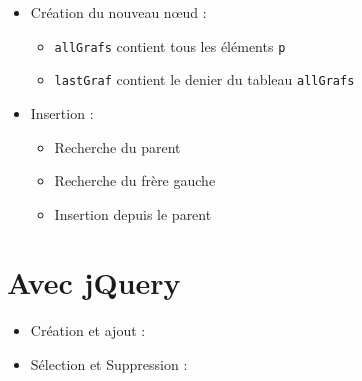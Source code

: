 \begin{itemize}
\tightlist
\item
  Création du nouveau nœud :

  \begin{itemize}
  \tightlist
  \item
    \textenglish{\texttt{allGrafs}} contient tous les éléments
    \textenglish{\texttt{p}}
  \item
    \textenglish{\texttt{lastGraf}} contient le denier du tableau
    \textenglish{\texttt{allGrafs}}
  \end{itemize}
\item
  Insertion :

  \begin{itemize}
  \tightlist
  \item
    Recherche du parent
  \item
    Recherche du frère gauche
  \item
    Insertion depuis le parent
  \end{itemize}
\end{itemize}

\hypertarget{avec-jquery}{%
\section{Avec jQuery}\label{avec-jquery}}

\begin{itemize}
\tightlist
\item
  Création et ajout :
\end{itemize}

\begin{english}

\begin{Shaded}
\begin{Highlighting}[]
    \OperatorTok{=} \FunctionTok{$}\NormalTok{(}\NormalTok{)}\OperatorTok{;}  
    \FunctionTok{$}\NormalTok{(}\NormalTok{)}\OperatorTok{;}                
\end{Highlighting}
\end{Shaded}

\end{english}

\begin{itemize}
\tightlist
\item
  Sélection et Suppression :
\end{itemize}

